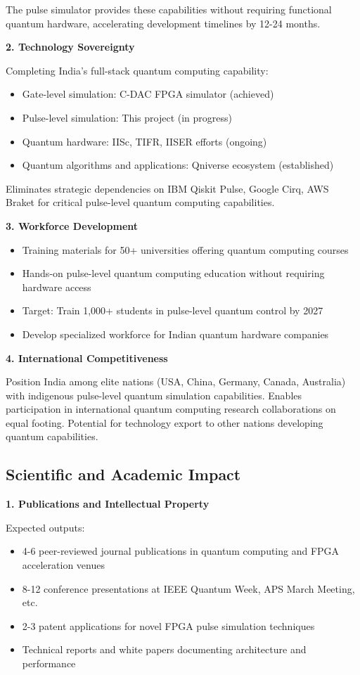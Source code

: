 \documentclass[12pt,a4paper]{article}
\begin{document}
The pulse simulator provides these capabilities without requiring functional quantum hardware, accelerating development timelines by 12-24 months.

\textbf{2. Technology Sovereignty}

Completing India's full-stack quantum computing capability:
\begin{itemize}[noitemsep]
\item Gate-level simulation: C-DAC FPGA simulator (achieved)
\item Pulse-level simulation: This project (in progress)
\item Quantum hardware: IISc, TIFR, IISER efforts (ongoing)
\item Quantum algorithms and applications: Qniverse ecosystem (established)
\end{itemize}

Eliminates strategic dependencies on IBM Qiskit Pulse, Google Cirq, AWS Braket for critical pulse-level quantum computing capabilities.

\textbf{3. Workforce Development}

\begin{itemize}[noitemsep]
\item Training materials for 50+ universities offering quantum computing courses
\item Hands-on pulse-level quantum computing education without requiring hardware access
\item Target: Train 1,000+ students in pulse-level quantum control by 2027
\item Develop specialized workforce for Indian quantum hardware companies
\end{itemize}

\textbf{4. International Competitiveness}

Position India among elite nations (USA, China, Germany, Canada, Australia) with indigenous pulse-level quantum simulation capabilities. Enables participation in international quantum computing research collaborations on equal footing. Potential for technology export to other nations developing quantum capabilities.

\subsection{Scientific and Academic Impact}

\textbf{1. Publications and Intellectual Property}

Expected outputs:
\begin{itemize}[noitemsep]
\item 4-6 peer-reviewed journal publications in quantum computing and FPGA acceleration venues
\item 8-12 conference presentations at IEEE Quantum Week, APS March Meeting, etc.
\item 2-3 patent applications for novel FPGA pulse simulation techniques
\item Technical reports and white papers documenting architecture and performance
\end{itemize}
\end{document}
